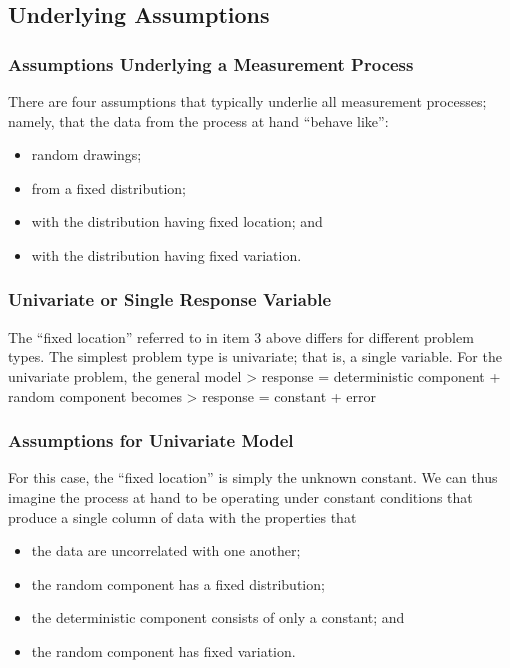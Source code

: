 \documentclass[]{book}
\providecommand{\tightlist}{%
  \setlength{\itemsep}{0pt}\setlength{\parskip}{0pt}}
\theoremstyle{definition}
\theoremstyle{definition}
\theoremstyle{definition}
\theoremstyle{remark}
\begin{document}
\subsection{Underlying Assumptions}\label{underlying-assumptions}

\subsubsection{Assumptions Underlying a Measurement
Process}\label{assumptions-underlying-a-measurement-process}

There are four assumptions that typically underlie all measurement
processes; namely, that the data from the process at hand ``behave
like'':

\begin{itemize}
\tightlist
\item
  random drawings;
\item
  from a fixed distribution;
\item
  with the distribution having fixed location; and
\item
  with the distribution having fixed variation.
\end{itemize}

\subsubsection{Univariate or Single Response
Variable}\label{univariate-or-single-response-variable}

The ``fixed location'' referred to in item 3 above differs for different
problem types. The simplest problem type is univariate; that is, a
single variable. For the univariate problem, the general model
\textgreater{} response = deterministic component + random component
becomes \textgreater{} response = constant + error

\subsubsection{Assumptions for Univariate
Model}\label{assumptions-for-univariate-model}

For this case, the ``fixed location'' is simply the unknown constant. We
can thus imagine the process at hand to be operating under constant
conditions that produce a single column of data with the properties that

\begin{itemize}
\tightlist
\item
  the data are uncorrelated with one another;
\item
  the random component has a fixed distribution;
\item
  the deterministic component consists of only a constant; and
\item
  the random component has fixed variation.
\end{itemize}
\end{document}
